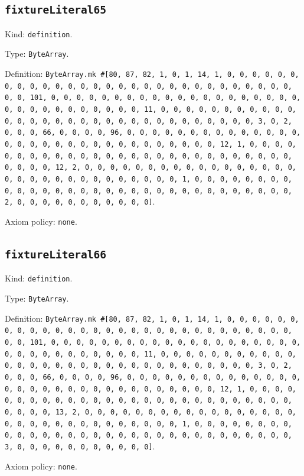 \documentclass[11pt]{article}
\begin{document}
\subsection*{\texttt{fixtureLiteral65}}
\noindent Kind: \texttt{definition}.\par
\noindent Type: \texttt{ByteArray}.\par
\noindent Definition: \texttt{ByteArray.mk \#[80, 87, 82, 1, 0, 1, 14, 1, 0, 0, 0, 0, 0, 0, 0, 0, 0, 0, 0, 0, 0, 0, 0, 0, 0, 0, 0, 0, 0, 0, 0, 0, 0, 0, 0, 0, 0, 0, 0, 101, 0, 0, 0, 0, 0, 0, 0, 0, 0, 0, 0, 0, 0, 0, 0, 0, 0, 0, 0, 0, 0, 0, 0, 0, 0, 0, 0, 0, 0, 0, 0, 11, 0, 0, 0, 0, 0, 0, 0, 0, 0, 0, 0, 0, 0, 0, 0, 0, 0, 0, 0, 0, 0, 0, 0, 0, 0, 0, 0, 0, 0, 0, 0, 3, 0, 2, 0, 0, 0, 66, 0, 0, 0, 0, 96, 0, 0, 0, 0, 0, 0, 0, 0, 0, 0, 0, 0, 0, 0, 0, 0, 0, 0, 0, 0, 0, 0, 0, 0, 0, 0, 0, 0, 0, 0, 0, 12, 1, 0, 0, 0, 0, 0, 0, 0, 0, 0, 0, 0, 0, 0, 0, 0, 0, 0, 0, 0, 0, 0, 0, 0, 0, 0, 0, 0, 0, 0, 0, 0, 12, 2, 0, 0, 0, 0, 0, 0, 0, 0, 0, 0, 0, 0, 0, 0, 0, 0, 0, 0, 0, 0, 0, 0, 0, 0, 0, 0, 0, 0, 0, 0, 0, 1, 0, 0, 0, 0, 0, 0, 0, 0, 0, 0, 0, 0, 0, 0, 0, 0, 0, 0, 0, 0, 0, 0, 0, 0, 0, 0, 0, 0, 0, 0, 0, 2, 0, 0, 0, 0, 0, 0, 0, 0, 0, 0, 0]}.\par
\noindent Axiom policy: \texttt{none}.\par
\subsection*{\texttt{fixtureLiteral66}}
\noindent Kind: \texttt{definition}.\par
\noindent Type: \texttt{ByteArray}.\par
\noindent Definition: \texttt{ByteArray.mk \#[80, 87, 82, 1, 0, 1, 14, 1, 0, 0, 0, 0, 0, 0, 0, 0, 0, 0, 0, 0, 0, 0, 0, 0, 0, 0, 0, 0, 0, 0, 0, 0, 0, 0, 0, 0, 0, 0, 0, 101, 0, 0, 0, 0, 0, 0, 0, 0, 0, 0, 0, 0, 0, 0, 0, 0, 0, 0, 0, 0, 0, 0, 0, 0, 0, 0, 0, 0, 0, 0, 0, 11, 0, 0, 0, 0, 0, 0, 0, 0, 0, 0, 0, 0, 0, 0, 0, 0, 0, 0, 0, 0, 0, 0, 0, 0, 0, 0, 0, 0, 0, 0, 0, 3, 0, 2, 0, 0, 0, 66, 0, 0, 0, 0, 96, 0, 0, 0, 0, 0, 0, 0, 0, 0, 0, 0, 0, 0, 0, 0, 0, 0, 0, 0, 0, 0, 0, 0, 0, 0, 0, 0, 0, 0, 0, 0, 12, 1, 0, 0, 0, 0, 0, 0, 0, 0, 0, 0, 0, 0, 0, 0, 0, 0, 0, 0, 0, 0, 0, 0, 0, 0, 0, 0, 0, 0, 0, 0, 0, 13, 2, 0, 0, 0, 0, 0, 0, 0, 0, 0, 0, 0, 0, 0, 0, 0, 0, 0, 0, 0, 0, 0, 0, 0, 0, 0, 0, 0, 0, 0, 0, 0, 1, 0, 0, 0, 0, 0, 0, 0, 0, 0, 0, 0, 0, 0, 0, 0, 0, 0, 0, 0, 0, 0, 0, 0, 0, 0, 0, 0, 0, 0, 0, 0, 3, 0, 0, 0, 0, 0, 0, 0, 0, 0, 0, 0]}.\par
\noindent Axiom policy: \texttt{none}.\par
\end{document}

